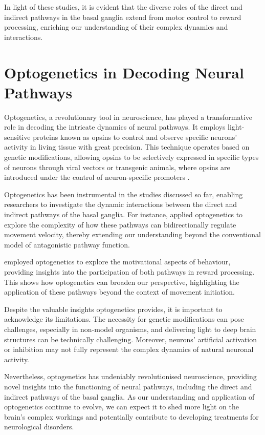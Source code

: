 \documentclass[10pt]{article}
\begin{document}
\begin{sloppypar}
  In light of these studies, it is evident that the diverse roles of the direct and indirect pathways in the basal ganglia extend from motor control to reward processing, enriching our understanding of their complex dynamics and interactions.

  \section{Optogenetics in Decoding Neural Pathways}
  \label{sec:the-role-of-optogenetics-in-neural-pathways}

  Optogenetics, a revolutionary tool in neuroscience, has played a transformative role in decoding the intricate dynamics of neural pathways. It employs light-sensitive proteins known as opsins to control and observe specific neurons’ activity in living tissue with great precision. This technique operates based on genetic modifications, allowing opsins to be selectively expressed in specific types of neurons through viral vectors or transgenic animals, where opsins are introduced under the control of neuron-specific promoters \citep{deisseroth_next-generation_2006}.

  Optogenetics has been instrumental in the studies discussed so far, enabling researchers to investigate the dynamic interactions between the direct and indirect pathways of the basal ganglia. For instance, \cite{yttri_opponent_2016} applied optogenetics to explore the complexity of how these pathways can bidirectionally regulate movement velocity, thereby extending our understanding beyond the conventional model of antagonistic pathway function.

  \cite{guillaumin_experimental_2021} employed optogenetics to explore the motivational aspects of behaviour, providing insights into the participation of both pathways in reward processing. This shows how optogenetics can broaden our perspective, highlighting the application of these pathways beyond the context of movement initiation.

  Despite the valuable insights optogenetics provides, it is important to acknowledge its limitations. The necessity for genetic modifications can pose challenges, especially in non-model organisms, and delivering light to deep brain structures can be technically challenging. Moreover, neurons’ artificial activation or inhibition may not fully represent the complex dynamics of natural neuronal activity.

  Nevertheless, optogenetics has undeniably revolutionised neuroscience, providing novel insights into the functioning of neural pathways, including the direct and indirect pathways of the basal ganglia. As our understanding and application of optogenetics continue to evolve, we can expect it to shed more light on the brain’s complex workings and potentially contribute to developing treatments for neurological disorders.


\end{sloppypar}
\end{document}
